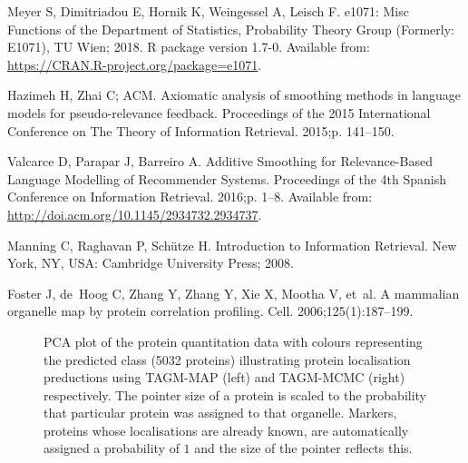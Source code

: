 \documentclass[10pt,letterpaper]{article}\usepackage[]{graphicx}\usepackage[]{color}
\begin{document}
\begin{thebibliography}{10}
Meyer S, Dimitriadou E, Hornik K, Weingessel A, Leisch F. e1071: Misc Functions
  of the Department of Statistics, Probability Theory Group (Formerly: E1071),
  TU Wien; 2018.
\newblock R package version 1.7-0.
\newblock Available from: \url{https://CRAN.R-project.org/package=e1071}.

Hazimeh H, Zhai C; ACM.
\newblock Axiomatic analysis of smoothing methods in language models for
  pseudo-relevance feedback.
\newblock Proceedings of the 2015 International Conference on The Theory of
  Information Retrieval. 2015;p. 141--150.

Valcarce D, Parapar J, Barreiro A.
\newblock Additive Smoothing for Relevance-Based Language Modelling of
  Recommender Systems.
\newblock Proceedings of the 4th Spanish Conference on Information Retrieval.
  2016;p. 1--8.
\newblock Available from: \url{http://doi.acm.org/10.1145/2934732.2934737}.

Manning C, Raghavan P, Sch\"{u}tze H.
\newblock Introduction to Information Retrieval.
\newblock New York, NY, USA: Cambridge University Press; 2008.

Foster J, de~Hoog C, Zhang Y, Zhang Y, Xie X, Mootha V, et~al.
\newblock A mammalian organelle map by protein correlation profiling.
\newblock Cell. 2006;125(1):187--199.

\end{thebibliography}




\begin{figure}[!p]
    \begin{subfigure}[t]{0.5\textwidth}

    \end{subfigure}%
    \begin{subfigure}[t]{0.5\textwidth}

    \end{subfigure}%
  \centering
  \caption{PCA plot of the protein quantitation data with colours
    representing the predicted class (5032 proteins) illustrating
    protein localisation preductions using TAGM-MAP (left) and
    TAGM-MCMC (right) respectively. The pointer size of a protein is
    scaled to the probability that particular protein was assigned to
    that organelle. Markers, proteins whose localisations are already
    known, are automatically assigned a probability of $1$ and the
    size of the pointer reflects this.}
  \label{fig:assignmentPCA} %
\end{figure}
\end{document}
